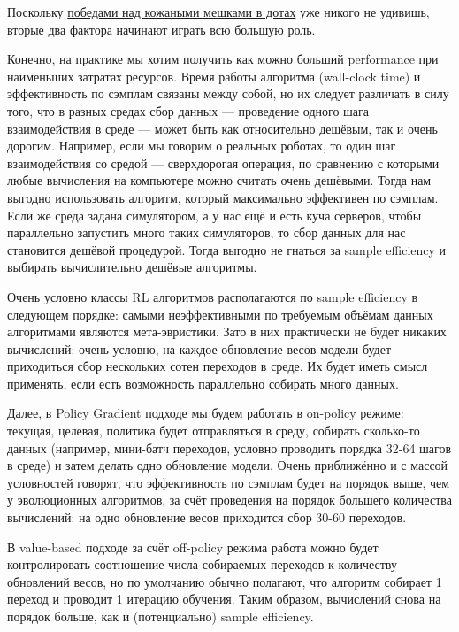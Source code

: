\begin{remark}Поскольку \href{https://openai.com/projects/five/}{победами над кожаными мешками в дотах} уже никого не удивишь, вторые два фактора начинают играть всю большую роль.
\end{remark}

Конечно, на практике мы хотим получить как можно больший performance при наименьших затратах ресурсов. Время работы алгоритма (wall-clock time) и эффективность по сэмплам связаны между собой, но их следует различать в силу того, что в разных средах сбор данных --- проведение одного шага взаимодействия в среде --- может быть как относительно дешёвым, так и очень дорогим. Например, если мы говорим о реальных роботах, то один шаг взаимодействия со средой --- сверхдорогая операция, по сравнению с которыми любые вычисления на компьютере можно считать очень дешёвыми. Тогда нам выгодно использовать алгоритм, который максимально эффективен по сэмплам. Если же среда задана симулятором, а у нас ещё и есть куча серверов, чтобы параллельно запустить много таких симуляторов, то сбор данных для нас становится дешёвой процедурой. Тогда выгодно не гнаться за sample efficiency и выбирать вычислительно дешёвые алгоритмы.

Очень условно классы RL алгоритмов располагаются по sample efficiency в следующем порядке: самыми неэффективными по требуемым объёмам данных алгоритмами являются мета-эвристики. Зато в них практически не будет никаких вычислений: очень условно, на каждое обновление весов модели будет приходиться сбор нескольких сотен переходов в среде. Их будет иметь смысл применять, если есть возможность параллельно собирать много данных. 

Далее, в Policy Gradient подходе мы будем работать в on-policy режиме: текущая, целевая, политика будет отправляться в среду, собирать сколько-то данных (например, мини-батч переходов, условно проводить порядка 32-64 шагов в среде) и затем делать одно обновление модели. Очень приближённо и с массой условностей говорят, что эффективность по сэмплам будет на порядок выше, чем у эволюционных алгоритмов, за счёт проведения на порядок большего количества вычислений: на одно обновление весов приходится сбор 30-60 переходов.

В value-based подходе за счёт off-policy режима работа можно будет контролировать соотношение числа собираемых переходов к количеству обновлений весов, но по умолчанию обычно полагают, что алгоритм собирает 1 переход и проводит 1 итерацию обучения. Таким образом, вычислений снова на порядок больше, как и (потенциально) sample efficiency.

